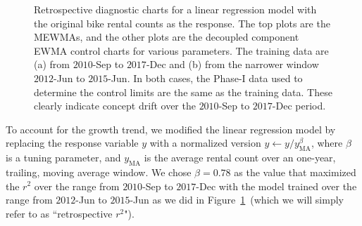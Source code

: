 \documentclass[twoside,11pt]{article}
\begin{document}
\begin{figure}[H]
\begin{subfigure}[t]{0.35\linewidth}
     \captionsetup{width=.95\linewidth}
     \caption{}
     \label{fig:bs_retro_narrow_train}
\end{subfigure}
\caption{Retrospective diagnostic charts for a linear regression model with the original bike rental counts as the response. The top plots are the MEWMAs, and the other plots are the decoupled component EWMA control charts for various parameters. The training data are (a) from $2010$-Sep to $2017$-Dec and (b) from the narrower window $2012$-Jun to $2015$-Jun. In both cases, the Phase-I data used to determine the control limits are the same as the training data. These clearly indicate concept drift over the $2010$-Sep to $2017$-Dec period.}
\label{fig:bike_sharing}
\end{figure}

To account for the growth trend, we modified the linear regression model by replacing the response variable $y$ with a normalized version  $y \leftarrow y/y_{\mathrm{MA}}^\beta$, where $\beta$ is a tuning parameter, and $y_{\mathrm{MA}}$ is the average rental count over an one-year, trailing, moving average window. We chose $\beta=0.78$ as the value that maximized the $r^2$ over the range from $2010$-Sep to $2017$-Dec with the model trained over the range from $2012$-Jun to $2015$-Jun as we did in Figure~\ref{fig:bs_retro_narrow_train}~(which we will simply refer to as ``retrospective $r^2$"). %
\end{document}
